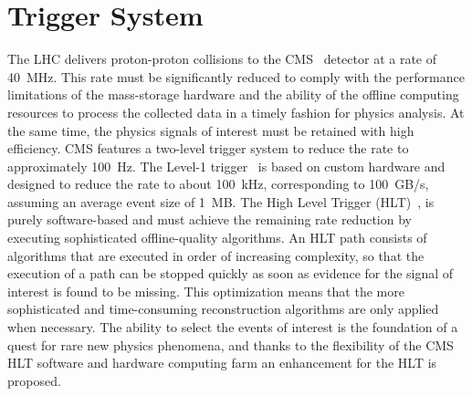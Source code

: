 \documentclass{JINST}
\begin{document}
\section{Trigger System}
%

The LHC delivers proton-proton collisions to the CMS~\cite{CMS:1994hea} detector at a rate of 40~MHz. This rate
must be significantly reduced to comply with the performance limitations of the mass-storage hardware and the ability
of the offline computing resources to process the collected data in a timely fashion for physics analysis. At the same
time, the physics signals of interest must be retained with high efficiency. CMS features a two-level trigger system to reduce
the rate to approximately 100~Hz. The Level-1 trigger~\cite{Dasu:2000ge} is based on custom hardware and designed to reduce the rate
to about 100~kHz, corresponding to 100~GB/s, assuming an average event size of 1~MB. The High Level Trigger (HLT)~\cite{Sphicas:2002gg},\cite{Sakulin:2007rj}
is purely software-based and must achieve the remaining rate reduction by executing sophisticated offline-quality algorithms.
An HLT path consists of algorithms that are executed in order of increasing complexity, so that
the execution of a path can be stopped quickly as soon as evidence for the signal of interest is found to be missing.
This optimization means that the more sophisticated and time-consuming reconstruction algorithms are only applied when necessary.
The ability to select the events of interest is the foundation of a
quest for rare new physics phenomena, and thanks to the flexibility of the CMS HLT software and hardware computing farm an enhancement for the HLT is proposed.
\end{document}
